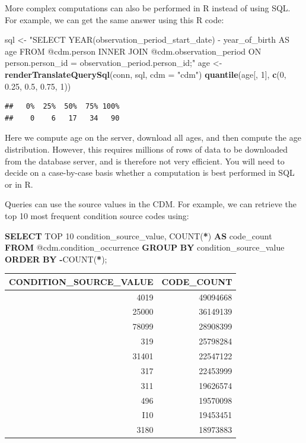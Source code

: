 \documentclass[11pt]{book}
\newenvironment{Shaded}{\begin{snugshade}}{\end{snugshade}}
\newcommand{\DataTypeTok}[1]{\textcolor[rgb]{0.13,0.29,0.53}{#1}}
\newcommand{\DecValTok}[1]{\textcolor[rgb]{0.00,0.00,0.81}{#1}}
\newcommand{\FloatTok}[1]{\textcolor[rgb]{0.00,0.00,0.81}{#1}}
\newcommand{\FunctionTok}[1]{\textcolor[rgb]{0.00,0.00,0.00}{#1}}
\newcommand{\KeywordTok}[1]{\textcolor[rgb]{0.13,0.29,0.53}{\textbf{#1}}}
\newcommand{\NormalTok}[1]{#1}
\newcommand{\OperatorTok}[1]{\textcolor[rgb]{0.81,0.36,0.00}{\textbf{#1}}}
\newcommand{\StringTok}[1]{\textcolor[rgb]{0.31,0.60,0.02}{#1}}
\theoremstyle{definition}
\theoremstyle{definition}
\theoremstyle{definition}
\theoremstyle{remark}
\begin{document}
More complex computations can also be performed in R instead of using SQL. For example, we can get the same answer using this R code:

\begin{Shaded}
\begin{Highlighting}[]
\NormalTok{sql <-}\StringTok{ "SELECT YEAR(observation_period_start_date) -}
\StringTok{               year_of_birth AS age}
\StringTok{FROM @cdm.person}
\StringTok{INNER JOIN @cdm.observation_period}
\StringTok{  ON person.person_id = observation_period.person_id;"}
\NormalTok{age <-}\StringTok{ }\KeywordTok{renderTranslateQuerySql}\NormalTok{(conn, sql, }\DataTypeTok{cdm =} \StringTok{"cdm"}\NormalTok{)}
\KeywordTok{quantile}\NormalTok{(age[, }\DecValTok{1}\NormalTok{], }\KeywordTok{c}\NormalTok{(}\DecValTok{0}\NormalTok{, }\FloatTok{0.25}\NormalTok{, }\FloatTok{0.5}\NormalTok{, }\FloatTok{0.75}\NormalTok{, }\DecValTok{1}\NormalTok{))}
\end{Highlighting}
\end{Shaded}

\begin{verbatim}
##   0%  25%  50%  75% 100% 
##    0    6   17   34   90
\end{verbatim}

Here we compute age on the server, download all ages, and then compute the age distribution. However, this requires millions of rows of data to be downloaded from the database server, and is therefore not very efficient. You will need to decide on a case-by-case basis whether a computation is best performed in SQL or in R.

Queries can use the source values in the CDM. For example, we can retrieve the top 10 most frequent condition source codes using:

\begin{Shaded}
\begin{Highlighting}[]
\KeywordTok{SELECT}\NormalTok{ TOP }\DecValTok{10}\NormalTok{ condition_source_value, }
  \FunctionTok{COUNT}\NormalTok{(}\OperatorTok{*}\NormalTok{) }\KeywordTok{AS}\NormalTok{ code_count}
\KeywordTok{FROM}\NormalTok{ @cdm.condition_occurrence}
\KeywordTok{GROUP} \KeywordTok{BY}\NormalTok{ condition_source_value}
\KeywordTok{ORDER} \KeywordTok{BY} \OperatorTok{-}\FunctionTok{COUNT}\NormalTok{(}\OperatorTok{*}\NormalTok{);}
\end{Highlighting}
\end{Shaded}

\begin{longtable}[]{@{}rr@{}}
\toprule
CONDITION\_SOURCE\_VALUE & CODE\_COUNT\tabularnewline
\midrule
\endhead
4019 & 49094668\tabularnewline
25000 & 36149139\tabularnewline
78099 & 28908399\tabularnewline
319 & 25798284\tabularnewline
31401 & 22547122\tabularnewline
317 & 22453999\tabularnewline
311 & 19626574\tabularnewline
496 & 19570098\tabularnewline
I10 & 19453451\tabularnewline
3180 & 18973883\tabularnewline
\bottomrule
\end{longtable}
\end{document}
